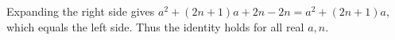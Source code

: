 Expanding the right side gives $a^2+(2n+1)a+2n-2n=a^2+(2n+1)a$, which equals the left side. Thus the identity holds for all real $a,n$.
